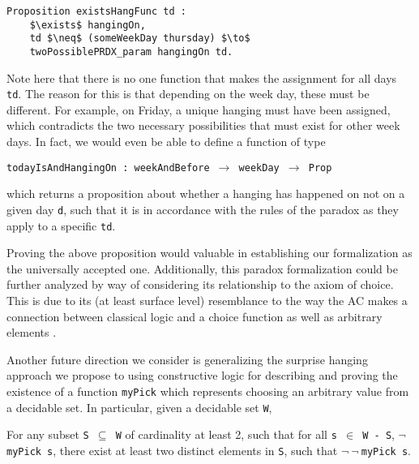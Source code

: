 \documentclass[journal]{journal}
\newenvironment{myindent}{\begin{adjustwidth}{1cm}{}}{\end{adjustwidth}}
\begin{document}
\begin{lstlisting}[mathescape=true]
  Proposition existsHangFunc td :
    $\exists$ hangingOn,
    td $\neq$ (someWeekDay thursday) $\to$
    twoPossiblePRDX_param hangingOn td.
\end{lstlisting}

Note here that there is no one function that makes the assignment for all days
{\tt td}. The reason for this is that depending on the week day, these must be different.
For example, on Friday, a unique hanging must have been assigned, which contradicts
the two necessary possibilities that must exist for other week days. In fact,
we would even be able to define a function of type

{\tt todayIsAndHangingOn : weekAndBefore $\to$ weekDay $\to$ Prop}

which returns a proposition about whether a hanging has happened on not on a given day {\tt d}, such that
it is in accordance with the rules of the paradox as they apply to a specific
{\tt td}.

Proving the above proposition would valuable in
establishing our formalization as the universally accepted one. Additionally,
this paradox formalization could be further analyzed by way of considering its
relationship to the axiom of choice. This is due to its (at least surface level)
resemblance to the way the AC makes a connection between classical logic
and a choice function \cite{accomp} as well as arbitrary elements \cite{randomness}.

Another future direction we consider is generalizing the surprise hanging
approach we propose to using constructive logic for describing and proving
the existence of a function {\tt myPick}
which represents choosing an arbitrary value from a decidable set. In particular,
given a decidable set {\tt W}, \newline

\begin{myindent}
For any subset {\tt S $\subseteq$ W} of cardinality at least 2, such that for all
{\tt s $\in$ W - S}, $\neg ${\tt myPick s}, there exist at least two distinct
elements in {\tt S}, such that $\neg~\neg~${\tt myPick s}.
\end{myindent}
\end{document}
